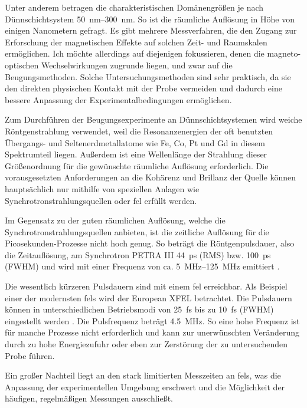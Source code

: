 \noindent
Unter anderem betragen die charakteristischen Domänengrößen je nach Dünnschichtsystem \SIrange[range-units = single]{50}{300}{\nano\meter}. So ist die räumliche Auflösung in Höhe von einigen Nanometern gefragt. Es gibt mehrere Messverfahren, die den Zugang zur Erforschung der magnetischen Effekte auf solchen Zeit- und Raumskalen ermöglichen. Ich möchte allerdings auf diejenigen fokussieren, denen die magneto-optischen Wechselwirkungen zugrunde liegen, und zwar auf die Beugungsmethoden. Solche Untersuchungsmethoden sind sehr praktisch, da sie den direkten physischen Kontakt mit der Probe vermeiden und dadurch eine bessere Anpassung der Experimentalbedingungen ermöglichen.

\noindent
Zum Durchführen der Beugungsexperimente an Dünnschichtsystemen wird weiche Röntgenstrahlung verwendet, weil die Resonanzenergien der oft benutzten Übergangs- und Seltenerdmetallatome wie Fe, Co, Pt und Gd in diesem Spektrumteil liegen. Außerdem ist eine Wellenlänge der Strahlung dieser Größenordnung für die gewünschte räumliche Auflösung erforderlich. Die vorausgesetzten Anforderungen an die Kohärenz und Brillanz der Quelle können hauptsächlich nur mithilfe von speziellen Anlagen wie Synchrotronstrahlungsquellen oder \gls{fel} erfüllt werden.  %

\noindent
Im Gegensatz zu der guten räumlichen Auflösung, welche die Synchrotronstrahlungsquellen anbieten, ist die zeitliche Auflösung für die Picosekunden-Prozesse nicht hoch genug. So beträgt die Röntgenpulsdauer, also die Zeitauflösung, am Synchrotron PETRA III \SI{44}{\pico\second} (RMS) bzw. \SI{100}{\pico\second} (FWHM) und wird mit einer Frequenz von ca. \SIrange[range-units = single]{5}{125}{\mega\hertz} emittiert \cite{noauthor_machine_nodate}.

\noindent
Die wesentlich kürzeren Pulsdauern sind mit einem \gls{fel} erreichbar. Als Beispiel einer der modernsten \gls{fel}s wird der European XFEL betrachtet. Die Pulsdauern können in unterschiedlichen Betriebsmodi von \SI{25}{\femto\second} bis zu \SI{10}{\femto\second} (FWHM) eingestellt werden \cite{tschentscher_photon_2017}. Die Pulsfrequenz beträgt \SI{4,5}{\mega\hertz}. So eine hohe Frequenz ist für manche Prozesse nicht erforderlich und kann zur unerwünschten Veränderung durch zu hohe Energiezufuhr oder eben zur Zerstörung der zu untersuchenden Probe führen. 

\noindent
Ein großer Nachteil liegt an den stark limitierten Messzeiten an \gls{fel}s, was die Anpassung der experimentellen Umgebung erschwert und die Möglichkeit der häufigen, regelmäßigen Messungen ausschließt.

